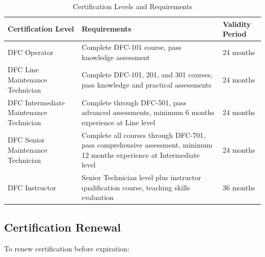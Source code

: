\documentclass[12pt,a4paper,twoside,openright]{book}
\newcommand{\tabletextfont}{\normalfont\rmfamily}
\newcommand{\tableheadfont}{\normalfont\bfseries}
\begin{document}
\begin{table}[h]
\centering
\setlength{\tabcolsep}{5pt} %
\begin{tabular}{|p{}|p{}|p{}|}
\hline
\tableheadfont\textbf{Certification Level} & \tableheadfont\textbf{Requirements} & \tableheadfont\textbf{Validity Period} \\
\hline
\tabletextfont DFC Operator & Complete DFC-101 course, pass knowledge assessment & 24 months \\
\hline
\tabletextfont DFC Line Maintenance Technician & Complete DFC-101, 201, and 301 courses, pass knowledge and practical assessments & 24 months \\
\hline
\tabletextfont DFC Intermediate Maintenance Technician & Complete through DFC-501, pass advanced assessments, minimum 6 months experience at Line level & 24 months \\
\hline
\tabletextfont DFC Senior Maintenance Technician & Complete all courses through DFC-701, pass comprehensive assessment, minimum 12 months experience at Intermediate level & 24 months \\
\hline
\tabletextfont DFC Instructor & Senior Technician level plus instructor qualification course, teaching skills evaluation & 36 months \\
\hline
\end{tabular}
\caption{Certification Levels and Requirements}
\end{table}

\subsection{Certification Renewal}

To renew certification before expiration:
\end{document}
